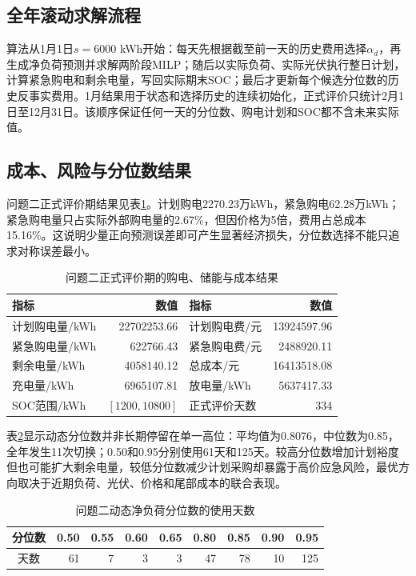 \documentclass[UTF8,a4paper,12pt,fontset=fandol]{ctexart}
\numberwithin{equation}{section}
\begin{document}
\subsection{全年滚动求解流程}

算法从1月1日$s=6000$ kWh开始：每天先根据截至前一天的历史费用选择$\alpha_d$，再生成净负荷预测并求解两阶段MILP；随后以实际负荷、实际光伏执行整日计划，计算紧急购电和剩余电量，写回实际期末SOC；最后才更新每个候选分位数的历史反事实费用。1月结果用于状态和选择历史的连续初始化，正式评价只统计2月1日至12月31日。该顺序保证任何一天的分位数、购电计划和SOC都不含未来实际值。

\subsection{成本、风险与分位数结果}

问题二正式评价期结果见表\ref{tab:q2-results}。计划购电2270.23万kWh，紧急购电62.28万kWh；紧急购电量只占实际外部购电量的2.67\%，但因价格为5倍，费用占总成本15.16\%。这说明少量正向预测误差即可产生显著经济损失，分位数选择不能只追求对称误差最小。

\begin{table}[htbp]
\centering
\small
\caption{问题二正式评价期的购电、储能与成本结果}\label{tab:q2-results}
\begin{tabular}{lr@{\qquad}lr}
\toprule
指标 & 数值 & 指标 & 数值\\
\midrule
计划购电量/kWh & 22702253.66 & 计划购电费/元 & 13924597.96\\
紧急购电量/kWh & 622766.43 & 紧急购电费/元 & 2488920.11\\
剩余电量/kWh & 4058140.12 & 总成本/元 & 16413518.08\\
充电量/kWh & 6965107.81 & 放电量/kWh & 5637417.33\\
SOC范围/kWh & $[1200,10800]$ & 正式评价天数 & 334\\
\bottomrule
\end{tabular}
\end{table}

表\ref{tab:q2-alpha}显示动态分位数并非长期停留在单一高位：平均值为0.8076，中位数为0.85，全年发生11次切换；0.50和0.95分别使用61天和125天。较高分位数增加计划裕度但也可能扩大剩余电量，较低分位数减少计划采购却暴露于高价应急风险，最优方向取决于近期负荷、光伏、价格和尾部成本的联合表现。

\begin{table}[htbp]
\centering
\small
\caption{问题二动态净负荷分位数的使用天数}\label{tab:q2-alpha}
\begin{tabular}{crrrrrrrr}
\toprule
分位数 & 0.50 & 0.55 & 0.60 & 0.65 & 0.80 & 0.85 & 0.90 & 0.95\\
\midrule
天数 & 61 & 7 & 3 & 3 & 47 & 78 & 10 & 125\\
\bottomrule
\end{tabular}
\end{table}
\end{document}
